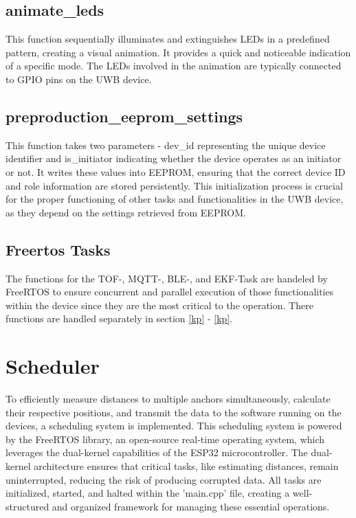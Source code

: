 \subsection{animate\_leds}
\label{subsec:animate_leds}
This function sequentially illuminates and extinguishes LEDs in a predefined pattern, creating a visual animation. 
It provides a quick and noticeable indication of a specific mode. 
The LEDs involved in the animation are typically connected to GPIO pins on the UWB device. 

\subsection{preproduction\_eeprom\_settings}
\label{subsec:preproduction_eeprom_settings}
This function takes two parameters - dev\_id representing the unique device identifier and is\_initiator indicating whether the device operates as an initiator or not. 
It writes these values into EEPROM, ensuring that the correct device ID and role information are stored persistently. This initialization process is crucial for the proper functioning of other tasks and functionalities in the UWB device, as they depend on the settings retrieved from EEPROM.

\subsection{Freertos Tasks}
\label{subsec:Freertos_Tasks}
The functions for the TOF-, MQTT-, BLE-, and EKF-Task are handeled by FreeRTOS to ensure concurrent and parallel execution of those functionalities within the device since they are the most critical to the operation. 
There functions are handled separately in section \ref{kp} - \ref{kp}. 

\section{Scheduler}
\label{sec:Scheduler}
To efficiently measure distances to multiple anchors simultaneously, calculate their respective positions, and transmit the data to the software running on the devices, a scheduling system is implemented. 
This scheduling system is powered by the FreeRTOS library, an open-source real-time operating system, which leverages the dual-kernel capabilities of the ESP32 microcontroller.
\vspace{4pt}
\newline
The dual-kernel architecture ensures that critical tasks, like estimating distances, remain uninterrupted, reducing the risk of producing corrupted data. 
All tasks are initialized, started, and halted within the 'main.cpp' file, creating a well-structured and organized framework for managing these essential operations.


